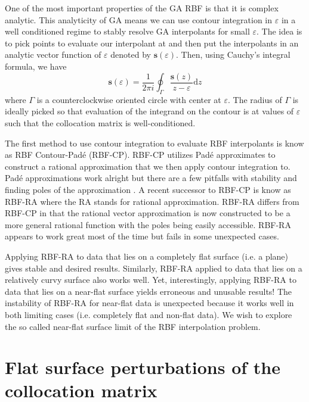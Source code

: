 \documentclass[a4paper,11pt]{article}
\newcommand{\eps}{\varepsilon}
\newcommand{\dd}[1]{\mathrm{d}#1}
\begin{document}
One of the most important properties of the GA RBF is that it is complex analytic. This analyticity of GA means we can use contour integration in $ \eps $ in a well conditioned regime to stably resolve GA interpolants for small $ \eps $. The idea is to pick points to evaluate our interpolant at and then put the interpolants in an analytic vector function of $ \eps $ denoted by $ \mathbf{s}(\eps) $. Then, using Cauchy's integral formula, we have
\[
	\mathbf{s}(\eps) = \frac{1}{2\pi i} \oint_\Gamma \frac{\mathbf{s}(z)}{z - \eps} \dd z
\] 
where $ \Gamma $ is a counterclockwise oriented circle with center at $ \eps $. The radius of $ \Gamma $ is ideally picked so that evaluation of the integrand on the contour is at values of $ \eps $ such that the collocation matrix is well-conditioned. 

The first method to use contour integration to evaluate RBF interpolants is know as RBF Contour-Pad\'e (RBF-CP). RBF-CP utilizes Pad\'e approximates to construct a rational approximation that we then apply contour integration to. Pad\'e approximations work alright but there are a few pitfalls with stability and finding poles of the approximation \cite{rbf-ra}. A recent successor to RBF-CP is know as RBF-RA where the RA stands for rational approximation. RBF-RA differs from RBF-CP in that the rational vector approximation is now constructed to be a more general rational function with the poles being easily accessible. RBF-RA appears to work great most of the time but fails in some unexpected cases.

Applying RBF-RA to data that lies on a completely flat surface (i.e. a plane) gives stable and desired results. Similarly, RBF-RA applied to data that lies on a relatively curvy surface also works well. Yet, interestingly, applying RBF-RA to data that lies on a near-flat surface yields erroneous and unusable results! The instability of RBF-RA for near-flat data is unexpected because it works well in both limiting cases (i.e. completely flat and non-flat data). We wish to explore the so called near-flat surface limit of the RBF interpolation problem. 


\section{Flat surface perturbations of the collocation matrix}
\end{document}
